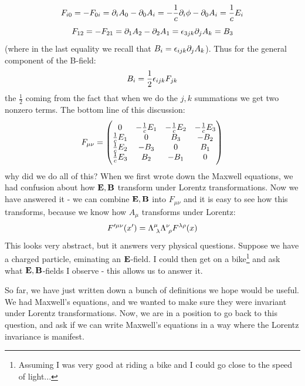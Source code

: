 \begin{equation}
    F_{i0} = -F_{0i} = \partial_i A_0 - \partial_0 A_i = -\frac{1}{c}\partial_i \phi - \partial_0 A_i = \frac{1}{c}E_i
\end{equation}
\begin{equation}
    F_{12} = -F_{21} = \partial_1 A_2 - \partial_2 A_1 = \epsilon_{3jk}\partial_j A_k = B_3
\end{equation}
(where in the last equality we recall that $B_i = \epsilon_{ijk}\partial_j A_k$). Thus for the general component of the B-field:
\begin{equation}
    B_i = \frac{1}{2}\epsilon_{ijk}F_{jk}
\end{equation}
the $\frac{1}{2}$ coming from the fact that when we do the $j, k$ summations we get two nonzero terms. The bottom line of this discussion:
\begin{equation}
    F_{\mu\nu} = \begin{pmatrix}0 & -\frac{1}{c}E_1 & -\frac{1}{c}E_2 & -\frac{1}{c}E_3 \\ \frac{1}{c}E_1 & 0 & B_3 & -B_2 \\ \frac{1}{c}E_2 & - B_3& 0 & B_1 \\ \frac{1}{c}E_3 & B_2 & -B_1 & 0\end{pmatrix}
\end{equation}
why did we do all of this? When we first wrote down the Maxwell equations, we had confusion about how $\mathbf{E}, \mathbf{B}$ transform under Lorentz transformations. Now we have answered it - we can combine $\mathbf{E}, \mathbf{B}$ into $F_{\mu\nu}$ and it is easy to see how this transforms, because we know how $A_\mu$ transforms under Lorentz:
\begin{equation}
    F'^{\mu\nu}(x') = \Lambda^{\mu}_{\sp\lambda}\Lambda^{\nu}_{\sp\rho}F^{\lambda\rho}(x)
\end{equation}
This looks very abstract, but it answers very physical questions. Suppose we have a charged particle, eminating an $\mathbf{E}$-field. I could then get on a bike\footnote{Assuming I was very good at riding a bike and I could go close to the speed of light...} and ask what $\mathbf{E}, \mathbf{B}$-fields I observe - this allows us to answer it.

So far, we have just written down a bunch of definitions we hope would be useful. We had Maxwell's equations, and we wanted to make sure they were invariant under Lorentz transformations. Now, we are in a position to go back to this question, and ask if we can write Maxwell's equations in a way where the Lorentz invariance is manifest.

